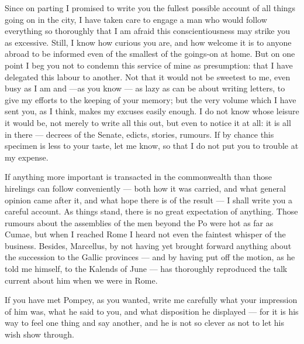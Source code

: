 

 Since on parting I promised to write you the fullest possible account of all things going on in the city, I have taken care to engage a man who would follow everything so thoroughly that I am afraid this conscientiousness may strike you as excessive. Still, I know how curious you are, and how welcome it is to anyone abroad to be informed even of the smallest of the goings-on at home. But on one point I beg you not to condemn this service of mine as presumption: that I have delegated this labour to another. Not that it would not be sweetest to me, even busy as I am and ---as you know --- as lazy as can be about writing letters, to give my efforts to the keeping of your memory; but the very volume which I have sent you, as I think, makes my excuses easily enough. I do not know whose leisure it would be, not merely to write all this out, but even to notice it at all: it is all in there --- decrees of the Senate, edicts, stories, rumours. If by chance this specimen is less to your taste, let me know, so that I do not put you to trouble at my expense.

 If anything more important is transacted in the commonwealth than those hirelings can follow conveniently --- both how it was carried, and what general opinion came after it, and what hope there is of the result --- I shall write you a careful account. As things stand, there is no great expectation of anything. Those rumours about the assemblies of the men beyond the Po were hot as far as Cumae, but when I reached Rome I heard not even the faintest whisper of the business. Besides, Marcellus, by not having yet brought forward anything about the succession to the Gallic provinces --- and by having put off the motion, as he told me himself, to the Kalends of June --- has thoroughly reproduced the talk current about him when we were in Rome.

 If you have met Pompey, as you wanted, write me carefully what your impression of him was, what he said to you, and what disposition he displayed --- for it is his way to feel one thing and say another, and he is not so clever as not to let his wish show through.

